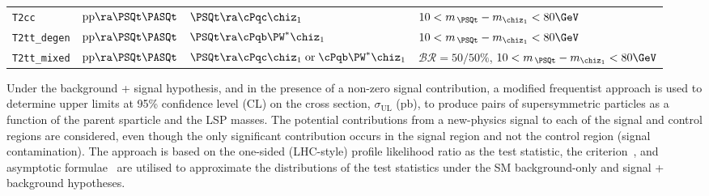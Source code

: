 \begin{table}[!t]
\begin{tabular}{ llll }
\texttt{T2cc}          %
                       & $\text{pp}\ra\PSQt\PASQt$      
                       & $\PSQt\ra\cPqc\chiz_1$
                       & $10 < m_{\,\PSQt} - m_{\chiz_1} < 80\GeV$                                      \\ [0.5ex]
\texttt{T2tt\_degen}   %
                       & $\text{pp}\ra\PSQt\PASQt$      
                       & $\PSQt\ra\cPqb\PW^*\chiz_1$
                       & $10 < m_{\,\PSQt} - m_{\chiz_1} < 80\GeV$                                      \\ [0.5ex]
\texttt{T2tt\_mixed}   %
                       & $\text{pp}\ra\PSQt\PASQt$      
                       & $\PSQt\ra\cPqc\chiz_1 \;\text{or}\; \cPqb\PW^*\chiz_1$
                       & $\mathcal{BR} = 50/50\%$, $10 < m_{\,\PSQt} - m_{\chiz_1} < 80\GeV$            \\ [0.5ex]
    \hline
  \end{tabular}
\end{table}

Under the background + signal hypothesis, and in the presence of a
non-zero signal contribution, a modified frequentist approach is used
to determine upper limits at 95\% confidence level (CL) on the cross
section, $\sigma_\text{UL}$ (pb), to produce pairs of supersymmetric
particles as a function of the parent sparticle and the LSP
masses. The potential contributions from a new-physics signal to each
of the signal and control regions are considered, even though the only
significant contribution occurs in the signal region and not the
control region (\ie signal contamination). The approach is based on
the one-sided (LHC-style) profile likelihood ratio as the test
statistic, the \cls criterion~\cite{junk, read}, and asymptotic
formulae~\cite{Cowan:2010js} are utilised to approximate the
distributions of the test statistics under the SM background-only and
signal + background hypotheses.

